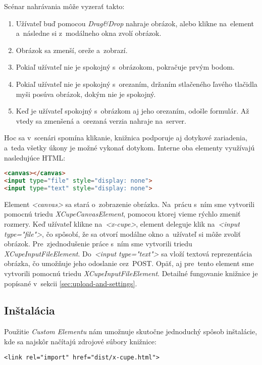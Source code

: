 Scénar nahrávania môže vyzerať takto:
\begin{enumerate}
	\item Užívateľ buď pomocou \emph{Drag\&Drop} nahraje obrázok, alebo klikne na~element a~následne si z~modálneho okna zvolí obrázok.
	\item Obrázok sa zmenší, oreže a~zobrazí.
	\item Pokiaľ užívateľ nie je spokojný s~obrázokom, pokračuje prvým bodom.
	\item Pokiaľ užívateľ nie je spokojný s~orezaním, držaním stlačeného ľavého tlačidla myši posúva obrázok, dokým nie je spokojný.
	\item Keď je užívateľ spokojný s~obrázkom aj jeho orezaním, odošle formulár. Až vtedy sa zmenšená a~orezaná verzia nahraje na~server.
\end{enumerate}

Hoc sa v~scenári spomína klikanie, knižnica podporuje aj dotykové zariadenia, a~teda všetky úkony je možné vykonať dotykom. Interne oba elementy využívajú nasledujúce HTML:

\begin{lstlisting}[language=HTML,caption=Interná štruktúra elementov \emph{<x-cupe>} a~\emph{<x-cupe-gallery>}.]
<canvas></canvas>
<input type="file" style="display: none">
<input type="text" style="display: none">
\end{lstlisting}


Element \emph{<canvas>} sa stará o~zobrazenie obrázka. Na~prácu s~ním sme vytvorili pomocnú triedu \emph{XCupeCanvasElement}, pomocou ktorej vieme rýchlo zmeniť rozmery. Keď užívateľ klikne na~\emph{<x-cupe>}, element deleguje klik na~\emph{<input type="file"\textgreater}, čo spôsobí, že sa otvorí modálne okno a~užívateľ si môže zvoliť obrázok. Pre~zjednodušenie práce s~ním sme vytvorili triedu \emph{XCupeInputFileElement}. Do~\emph{<input type="text"\textgreater} sa vloží textová reprezentácia obrázka, čo umožňuje jeho odoslanie cez~POST. Opäť, aj pre~tento element sme vytvorili pomocnú triedu \emph{XCupeInputFileElement}. Detailné fungovanie knižnice je popísané v~sekcii \ref{sec:upload-and-settings}.

\subsection{Inštalácia}

Použitie \emph{Custom Elementu} nám umožnuje skutočne jednoduchý spôsob inštalácie, kde sa najskôr načítajú zdrojové súbory knižnice:
\begin{lstlisting}
<link rel="import" href="dist/x-cupe.html">
\end{lstlisting}

